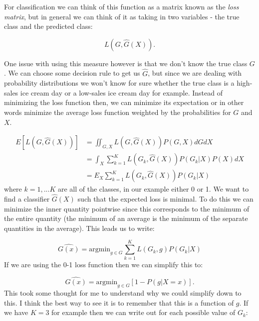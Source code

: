 \documentclass[paper=a4, fontsize=11pt]{scrartcl} %
\numberwithin{equation}{section} %
\numberwithin{figure}{section} %
\numberwithin{table}{section} %
\begin{document}
For classification we can think of this function as a matrix known as the \emph{loss matrix}, but in general we can think of it as taking in two variables - the true class and the predicted class:

\begin{equation}
L(G, \hat{G}(X)).
\end{equation}

One issue with using this measure however is that we don't know the true class $G$. We can choose some decision rule to get us $\hat{G}$, but since we are dealing with probability distributions we won't know for sure whether the true class is a high-sales ice cream day or a low-sales ice cream day for example. Instead of minimizing the loss function then, we can minimize its expectation or in other words minimize the average loss function weighted by the probabilities for $G$ and $X$.

\begin{equation}
\begin{split}
E[L(G, \hat{G}(X))] & = \iint_{G, X} {L(G, \hat{G}(X)) P(G, X) dG dX} \\
& = \int_{X} \sum_{k=1}^{K} {L(G_k, \hat{G}(X)) P(G_k|X) P(X) dX} \\
&= E_{X} \sum_{k=1}^{K} {L(G_k, \hat{G}(X)) P(G_k|X)}
\end{split}
\end{equation}
where $k=1,...K$ are all of the classes, in our example either 0 or 1. We want to find a classifier $\hat{G}(X)$ such that the expected loss is minimal. To do this we can minimize the inner quantity pointwise since this corresponds to the minimum of the entire quantity (the minimum of an average is the minimum of the separate quantities in the average). This leads us to write:

\begin{equation}
\hat{G(x)} = \text{argmin}_{g \in G} \sum_{k=1}^{K} {L(G_k, g) P(G_k|X)}
\end{equation}
If we are using the 0-1 loss function then we can simplify this to:

\begin{equation}
\hat{G(x)} = \text{argmin}_{g \in G} \left[1 - P(g|X=x) \right].
\end{equation}
This took some thought for me to understand why we could simplify down to this. I think the best way to see it is to remember that this is a function of $g$. If we have $K=3$ for example then we can write out for each possible value of $G_k$:
\end{document}
